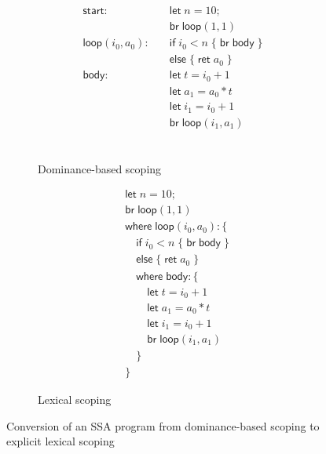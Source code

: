 \documentclass[acmsmall,screen,review]{acmart}
\newcommand{\ms}[1]{\ensuremath{\mathsf{#1}}}
\begin{document}
\begin{figure}
  \centering
  \begin{subfigure}[t]{.5\textwidth}
    \begin{align*}
      \ms{start}:\quad            & \ms{let}\;n = 10; \\
                                  & \ms{br}\;\ms{loop}(1, 1) \\
      \ms{loop}(i_0, a_0): \quad  & \ms{if}\;i_0 < n\; \{\;\ms{br}\;\ms{body}\;\} \\
                                  & \ms{else}\;\{\;\ms{ret}\;a_0\;\} \\
      \ms{body}: \quad            & \ms{let}\;t = i_0 + 1 \\
                                  & \ms{let}\;a_1 = a_0 * t \\
                                  & \ms{let}\;i_1 = i_0 + 1 \\
                                  & \ms{br}\;\ms{loop}(i_1, a_1) \\ \\ \\ \\ 
    \end{align*}
    \caption{Dominance-based scoping}
  \end{subfigure}%
  \begin{subfigure}[t]{.5\textwidth}
    \begin{align*}
      & \ms{let}\;n = 10; \\
      & \ms{br}\;\ms{loop}(1, 1) \\
      & \ms{where}\;\ms{loop}(i_0, a_0): \{ \\
      & \quad \ms{if}\;i_0 < n\;\{\;\ms{br}\;\ms{body}\;\} \\
      & \quad \ms{else}\;\{\;\ms{ret}\;a_0\;\} \\
      & \quad \ms{where}\;\ms{body}: \{\\ 
      & \qquad \ms{let}\;t = i_0 + 1 \\
      & \qquad \ms{let}\;a_1 = a_0 * t \\
      & \qquad \ms{let}\;i_1 = i_0 + 1 \\
      & \qquad \ms{br}\;\ms{loop}(i_1, a_1) \\
      & \quad \} \\
      & \}
    \end{align*}
    \caption{Lexical scoping}
  \end{subfigure}
  \caption{Conversion of an SSA program from dominance-based scoping to explicit lexical scoping}
  \Description{}
  \label{fig:dominance-to-lexical}
\end{figure}
\end{document}

